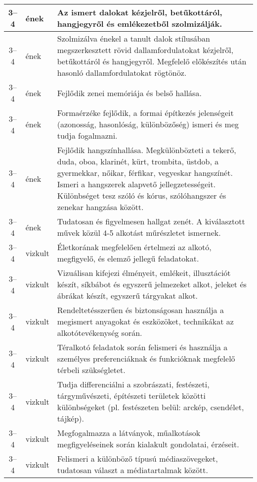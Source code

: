 \begin{small}
\begin{longtable}{c | p{2cm} |  p{11cm} }
              3--4 & ének & Az ismert dalokat kézjelről, betűkottáról, hangjegyről és emlékezetből szolmizálják. \\ \hline
              3--4 & ének & Szolmizálva énekel a tanult dalok stílusában megszerkesztett rövid dallamfordulatokat kézjelről, betűkottáról és hangjegyről. Megfelelő előkészítés után hasonló dallamfordulatokat rögtönöz. \\ \hline
              3--4 & ének & Fejlődik zenei memóriája és belső hallása. \\ \hline
              3--4 & ének & Formaérzéke fejlődik, a formai építkezés jelenségeit (azonosság, hasonlóság, különbözőség) ismeri és meg tudja fogalmazni. \\ \hline
              3--4 & ének & Fejlődik hangszínhallása. Megkülönbözteti a tekerő, duda, oboa, klarinét, kürt, trombita, üstdob, a gyermekkar, nőikar, férfikar, vegyeskar hangszínét. Ismeri a hangszerek alapvető jellegzetességeit. Különbséget tesz szóló és kórus, szólóhangszer és zenekar hangzása között. \\ \hline
              3--4 & ének & Tudatosan és figyelmesen hallgat zenét. A kiválasztott művek közül 4-5 alkotást műrészletet ismernek. \\ \hline
              3--4 & vizkult & Életkorának megfelelően értelmezi az alkotó, megfigyelő, és elemző jellegű feladatokat. \\ \hline
              3--4 & vizkult & Vizuálisan kifejezi élményeit, emlékeit, illusztációt készít, síkbábot és egyszerű jelmezeket alkot, jeleket és ábrákat készít, egyszerű tárgyakat alkot. \\ \hline
              3--4 & vizkult & Rendeltetésszerűen és biztonságosan használja a megismert anyagokat és eszközöket, technikákat az alkotótevékenység során. \\ \hline
              3--4 & vizkult & Téralkotó feladatok során felismeri és használja a személyes preferenciáknak és funkcióknak megfelelő térbeli szükségletet. \\ \hline
              3--4 & vizkult & Tudja  differenciálni a szobrászati, festészeti, tárgyművészeti, építészeti területek közötti különbségeket (pl. festészeten belül: arckép, csendélet, tájkép). \\ \hline
              3--4 & vizkult & Megfogalmazza a látványok, műalkotások megfigyeléseinek során kialakult gondolatai, érzéseit. \\ \hline
              3--4 & vizkult & Felismeri a különböző típusú médiaszövegeket, tudatosan választ a médiatartalmak között. \\ \hline

\end{longtable}
\end{small}
